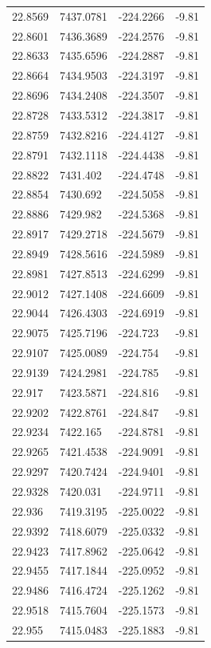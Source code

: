 \begin{table}[H]
\begin{tabular}{llll}
22.8569 & 7437.0781 & -224.2266 & -9.81 \\
22.8601 & 7436.3689 & -224.2576 & -9.81 \\
22.8633 & 7435.6596 & -224.2887 & -9.81 \\
22.8664 & 7434.9503 & -224.3197 & -9.81 \\
22.8696 & 7434.2408 & -224.3507 & -9.81 \\
22.8728 & 7433.5312 & -224.3817 & -9.81 \\
22.8759 & 7432.8216 & -224.4127 & -9.81 \\
22.8791 & 7432.1118 & -224.4438 & -9.81 \\
22.8822 & 7431.402 & -224.4748 & -9.81 \\
22.8854 & 7430.692 & -224.5058 & -9.81 \\
22.8886 & 7429.982 & -224.5368 & -9.81 \\
22.8917 & 7429.2718 & -224.5679 & -9.81 \\
22.8949 & 7428.5616 & -224.5989 & -9.81 \\
22.8981 & 7427.8513 & -224.6299 & -9.81 \\
22.9012 & 7427.1408 & -224.6609 & -9.81 \\
22.9044 & 7426.4303 & -224.6919 & -9.81 \\
22.9075 & 7425.7196 & -224.723 & -9.81 \\
22.9107 & 7425.0089 & -224.754 & -9.81 \\
22.9139 & 7424.2981 & -224.785 & -9.81 \\
22.917 & 7423.5871 & -224.816 & -9.81 \\
22.9202 & 7422.8761 & -224.847 & -9.81 \\
22.9234 & 7422.165 & -224.8781 & -9.81 \\
22.9265 & 7421.4538 & -224.9091 & -9.81 \\
22.9297 & 7420.7424 & -224.9401 & -9.81 \\
22.9328 & 7420.031 & -224.9711 & -9.81 \\
22.936 & 7419.3195 & -225.0022 & -9.81 \\
22.9392 & 7418.6079 & -225.0332 & -9.81 \\
22.9423 & 7417.8962 & -225.0642 & -9.81 \\
22.9455 & 7417.1844 & -225.0952 & -9.81 \\
22.9486 & 7416.4724 & -225.1262 & -9.81 \\
22.9518 & 7415.7604 & -225.1573 & -9.81 \\
22.955 & 7415.0483 & -225.1883 & -9.81 \\

\end{tabular}
\end{table}
